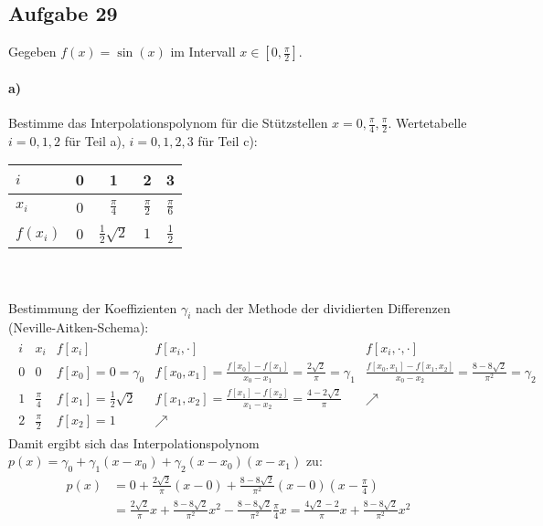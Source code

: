 \subsection*{Aufgabe 29}
Gegeben $f(x) = \sin(x)$  im Intervall $x \in [0, \frac{\pi}{2}]$.

\paragraph*{a)}
Bestimme das Interpolationspolynom für die Stützstellen $x = 0,  \frac{\pi}{4},  \frac{\pi}{2}$.
Wertetabelle $i = 0, 1, 2$ für Teil a), $i = 0, 1, 2, 3$ für Teil c): \newline
\begin{tabular}{l|cccc}
  $i$ & 0 & 1 & 2 & 3 \\
  \hline
  $x_i$ & 0 & $\frac{\pi}{4}$ &  $\frac{\pi}{2}$ &  $\frac{\pi}{6}$\\
  \hline
  $f(x_i)$ & 0 & $\frac{1}{2}\sqrt{2}$ &  $1$  &  $\frac{1}{2}$
\end{tabular} \\\\
Bestimmung der Koeffizienten $\gamma_i$ nach der Methode der dividierten
Differenzen (Neville-Aitken-Schema):
\begin{align}
\label{eq-schema}
\begin{array}{l|l|l|l|l}
  i & x_i & f[x_i] & f[x_i , \cdot] & f[x_i , \cdot, \cdot]\\
 \hline
  0 & 0 & f[x_0] = 0 = \gamma_0 &
    f[x_0, x_1] = \frac{f[x_0] - f[x_1]}{x_0 - x_1} = \frac{2 \sqrt{2}}{\pi} = \gamma_1&
    \frac{f[x_0, x_1] - f[x_1, x_2]}{x_0 - x_2} = \frac{8 - 8 \sqrt{2}}{\pi^2} = \gamma_2\\
  1 & \frac{\pi}{4} & f[x_1] = \frac{1}{2}\sqrt{2} &
    f[x_1, x_2] = \frac{f[x_1] - f[x_2]}{x_1 - x_2} = \frac{4 - 2 \sqrt{2}}{\pi} & \nearrow\\
  2 & \frac{\pi}{2} & f[x_2] = 1 & \nearrow
\end{array}
\end{align}
Damit ergibt sich das Interpolationspolynom $p(x) = \gamma_0 + \gamma_1(x-x_0) + \gamma_2(x-x_0)(x-x_1)$ zu:
\begin{align*}
p(x) & = 0 +  \frac{2 \sqrt{2}}{\pi} \left(x - 0\right) +
\left.\frac{8 - 8 \sqrt{2}}{\pi^2} \left(x- 0\right)\left(x-\frac{\pi}{4}\right)\right. \\
& = \frac{2 \sqrt{2}}{\pi} x + \frac{8 - 8 \sqrt{2}}{\pi^2} x^2 - \frac{8 - 8 \sqrt{2}}{\pi^2} \frac{\pi}{4} x
= \frac{4 \sqrt{2} - 2}{\pi} x + \frac{8 - 8 \sqrt{2}}{\pi^2} x^2
\end{align*}

